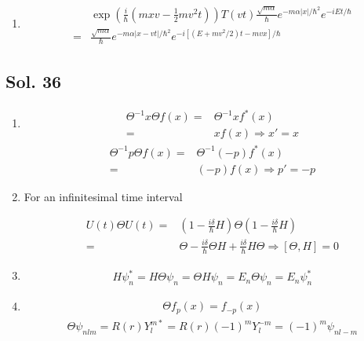 \begin{enumerate}
    \begin{align*}
        T(vt)V(x)f(x) = 
        V(x-vt)f(x-vt)
        =V(x-vt)T(vt)f(x)
    \end{align*}
    \begin{align*}
        &(-\frac{mv^2}{2}+pv)\Gamma\Psi 
        +\Gamma(\frac{p^2}{2m}+V(x))\Psi\\
        =&
        (-\frac{mv^2}{2}+pv
        +\frac{1}{2m}(m^2v^2 -2mvp + p^2 )
        +V(x-vt)
        )\Gamma\Psi\\
        =&
        (\frac{p^2}{2m}+V(x-vt))\Psi'
    \end{align*}
    \item 
    \begin{align*}
        &\exp\left(
        \frac{i}{\hbar}(mxv-\frac{1}{2}mv^2t)
        \right)
        T(vt)
        \frac{\sqrt{m\alpha}}{\hbar}e^{-m\alpha|x|/\hbar^2}e^{-i Et/\hbar}\\
        =&
        \frac{\sqrt{m\alpha}}{\hbar}e^{-m\alpha|x-vt|/\hbar^2}e^{-i 
        [(E+mv^2/2)t-mvx]/\hbar}
    \end{align*}
\end{enumerate}

\subsection*{Sol. 36}
\begin{enumerate}
    \item 
    \begin{align*}
        \Theta^{-1}x\Theta f(x)
        =& \Theta^{-1} xf^*(x)\\
        =&xf(x)\Rightarrow x'=x
    \end{align*}
    \begin{align*}
        \Theta^{-1}p\Theta f(x)
        =& \Theta^{-1} (-p)f^*(x)\\
        =&(-p)f(x)\Rightarrow p'=-p
    \end{align*}
    \item 
    For an infinitesimal time interval

    \begin{align*}
        U(t)\Theta U(t)
        =& (1-\frac{i\delta}{\hbar}H)\Theta (1-\frac{i\delta}{\hbar}H)\\
        =&\Theta -\frac{i\delta}{\hbar}\Theta H + \frac{i\delta}{\hbar}H\Theta
        \Rightarrow
       [\Theta,H] = 0 
    \end{align*}
    \item 
    \begin{align*}
        H\psi_n^* =H\Theta\psi_n = \Theta H\psi_n = E_n\Theta\psi_n=E_n\psi_n^* 
    \end{align*}
    \item 
    \begin{align*}
        \Theta f_p(x)=f_{-p}(x)
    \end{align*}
    \begin{align*}
        \Theta\psi_{nlm}=R(r)Y^{m*}_l
        =R(r)(-1)^mY^{-m}_l = (-1)^m\psi_{nl-m}
    \end{align*}
\end{enumerate}

